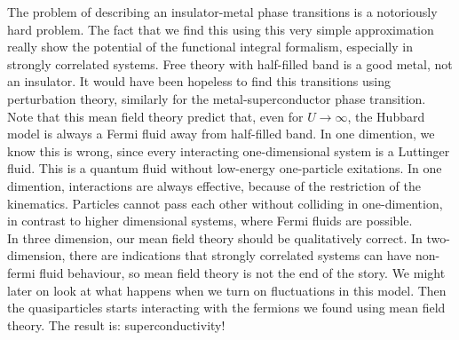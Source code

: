 The problem of describing an insulator-metal phase transitions is a notoriously hard problem. The fact that we find this using this very simple approximation really show the potential of the functional integral formalism, especially in strongly correlated systems. Free theory with half-filled band is a good metal, not an insulator. It would have been hopeless to find this transitions using perturbation theory, similarly for the metal-superconductor phase transition. Note that this mean field theory predict that, even for $U \to \infty$, the Hubbard model is always a Fermi fluid away from half-filled band. In one dimention, we know this is wrong, since every interacting one-dimensional system is a Luttinger fluid. This is a quantum fluid without low-energy one-particle exitations. In one dimention, interactions are always effective, because of the restriction of the kinematics. Particles cannot pass each other without colliding in one-dimention, in contrast to higher dimensional systems, where Fermi fluids are possible. \\

In three dimension, our mean field theory should be qualitatively correct. In two-dimension, there are indications that strongly correlated systems can have non-fermi fluid behaviour, so mean field theory is not the end of the story. We might later on look at what happens when we turn on fluctuations in this model. Then the quasiparticles starts interacting with the fermions we found using mean field theory. The result is: superconductivity! \\ 

